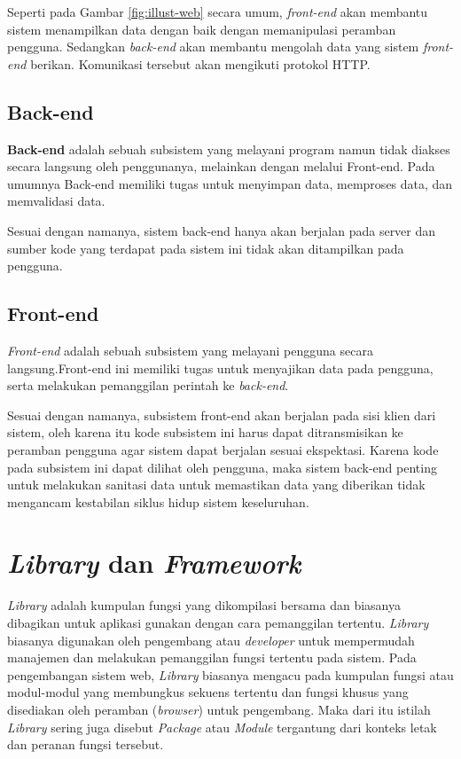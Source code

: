     Seperti pada Gambar \ref{fig:illust-web} secara umum, \textit{front-end} akan 
    membantu sistem menampilkan data dengan baik dengan memanipulasi peramban pengguna.
    Sedangkan \textit{back-end} akan membantu
    mengolah data yang sistem \textit{front-end} berikan. Komunikasi tersebut akan
    mengikuti protokol HTTP.

\subsection{Back-end}
    \textbf{Back-end} adalah sebuah subsistem yang melayani program namun
    tidak diakses secara langsung oleh penggunanya, melainkan dengan melalui
    Front-end\cite{oxford:definition-backend}. Pada umumnya Back-end memiliki
    tugas untuk menyimpan data, memproses data, dan memvalidasi data.
    
    Sesuai dengan namanya, sistem back-end hanya akan berjalan pada server dan
    sumber kode yang terdapat pada sistem ini tidak akan ditampilkan pada
    pengguna.

\subsection{Front-end}
    \textit{Front-end} adalah sebuah subsistem yang
    melayani pengguna secara langsung\cite{oxford:definition-frontend}.Front-end
    ini memiliki tugas untuk menyajikan data pada pengguna, serta melakukan
    pemanggilan perintah ke \textit{back-end}.
    
    Sesuai dengan namanya, subsistem front-end akan berjalan pada sisi klien
    dari sistem, oleh karena itu kode subsistem ini harus dapat ditransmisikan
    ke peramban pengguna agar sistem dapat berjalan sesuai ekspektasi. Karena
    kode pada subsistem ini dapat dilihat oleh pengguna, maka sistem back-end
    penting untuk melakukan sanitasi data untuk memastikan data yang diberikan
    tidak mengancam kestabilan siklus hidup sistem keseluruhan.

\section{\textit{Library} dan \textit{Framework}}
    \textit{Library} adalah kumpulan fungsi yang dikompilasi bersama dan
    biasanya dibagikan untuk aplikasi gunakan dengan cara pemanggilan tertentu.
    \textit{Library} biasanya digunakan oleh pengembang atau \emph{developer}
    untuk mempermudah manajemen dan melakukan pemanggilan fungsi tertentu pada
    sistem. Pada pengembangan sistem web, \textit{Library} biasanya mengacu pada
    kumpulan fungsi atau modul-modul yang membungkus sekuens tertentu dan fungsi
    khusus yang disediakan oleh peramban (\textit{browser}) untuk pengembang.
    Maka dari itu istilah \textit{Library} sering juga disebut \textit{Package}
    atau \textit{Module} tergantung dari konteks letak dan peranan fungsi
    tersebut\cite{npm-docs:packages-n-modules}\cite{node-docs:CommonJS-modules}.
    
